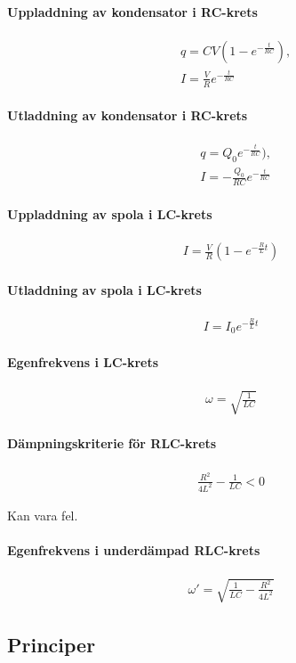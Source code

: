 \paragraph{Uppladdning av kondensator i RC-krets}
\begin{align*}
	&q = CV(1 - e^{-\frac{t}{RC}}), \\
	&I = \frac{V}{R}e^{-\frac{t}{RC}}
\end{align*}

\deriv

\paragraph{Utladdning av kondensator i RC-krets}
\begin{align*}
	&q = Q_0e^{-\frac{t}{RC}}), \\
	&I = -\frac{Q_0}{RC}e^{-\frac{t}{RC}}
\end{align*}

\deriv

\paragraph{Uppladdning av spola i LC-krets}
\begin{align*}
	I = \frac{V}{R}\left(1 -e^{-\frac{R}{L}t}\right)
\end{align*}

\deriv

\paragraph{Utladdning av spola i LC-krets}
\begin{align*}
	I = I_0e^{-\frac{R}{L}t}
\end{align*}

\paragraph{Egenfrekvens i LC-krets}
\begin{align*}
	\omega = \sqrt{\frac{1}{LC}}
\end{align*}

\paragraph{Dämpningskriterie för RLC-krets}
\begin{align*}
	\frac{R^2}{4L^2} - \frac{1}{LC} < 0
\end{align*}

\deriv
Kan vara fel.

\paragraph{Egenfrekvens i underdämpad RLC-krets}
\begin{align*}
	\omega ' = \sqrt{\frac{1}{LC} - \frac{R^2}{4L^2}}
\end{align*}

\deriv

\subsection{Principer}